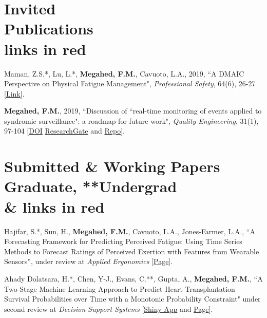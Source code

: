 \documentclass[margin,line]{res}
\begin{document}
\begin{resume}
\section{\sc Invited \\ Publications \\ \lbrack links in \textcolor{miamired}{red}\rbrack}
Maman, Z.S.*, Lu, L.*, \textbf{Megahed, F.M.}, Cavuoto, L.A., 2019, ``A DMAIC Perspective on Physical Fatigue Management", \textit{Professional Safety}, 64(6), 26-27 [\faFile*\href{https://foundation.assp.org/docs/SRCavuoto_0619.pdf}{Link}].

\vspace{-1.5mm}
\textbf{Megahed, F.M.}, 2019, ``Discussion of ``real-time monitoring of events applied to syndromic surveillance": a roadmap for future work", \textit{Quality Engineering}, 31(1), 97-104 [\faFile*\href{https://doi.org/10.1080/08982112.2018.1530358}{DOI} \faResearchgate \href{https://www.researchgate.net/publication/332391941_Discussion_on_Real-time_monitoring_of_events_applied_to_syndromic_surveillance}{ResearchGate} and \faGithub \href{https://github.com/fmegahed/qe-sparks-discussion}{Repo}].


\section{\sc Submitted \& Working  Papers \\  \lbrack*Graduate, **Undergrad \\ \& links in \textcolor{miamired}{red}\rbrack}


Hajifar, S.*, Sun, H., \textbf{Megahed, F.M.}, Cavuoto, L.A., Jones-Farmer, L.A., ``A Forecasting Framework for Predicting Perceived Fatigue: Using Time Series Methods to Forecast Ratings of Perceived Exertion with Features from Wearable Sensors'', under review at \textit{Applied Ergonomics} [\faGithub \href{https://sahand-hajifar.github.io/RPE_Forecasting.html}{Page}].

\vspace{-1.5mm}
Ahady Dolatsara, H.*, Chen, Y-J., Evans, C.**,  Gupta, A., \textbf{Megahed, F.M.}, ``A Two-Stage Machine Learning Approach to Predict Heart Transplantation Survival Probabilities over Time with a Monotonic Probability Constraint" under second review at \textit{Decision Support Systems} [\faRProject \href{https://dataviz.miamioh.edu/Heart-Transplant/monotonic/}{Shiny App} and \faGithub \href{https://ying-ju.github.io/heart_transplant.github.io/}{Page}].



\end{resume}
\end{document}
